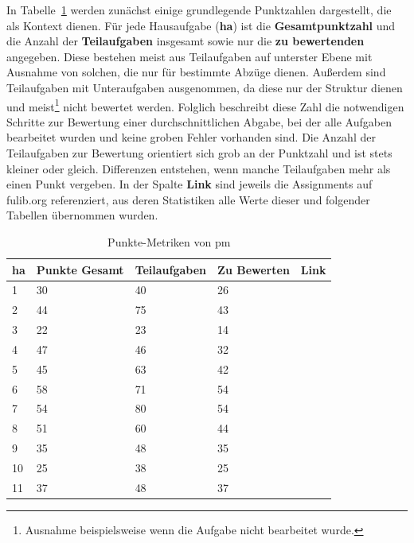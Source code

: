 In Tabelle~\ref{tbl:pm-points} werden zunächst einige grundlegende Punktzahlen dargestellt, die als Kontext dienen.
Für jede Hausaufgabe (\textbf{\acs{ha}}) ist die \textbf{Gesamtpunktzahl} und die Anzahl der \textbf{Teilaufgaben} insgesamt sowie nur die \textbf{zu bewertenden} angegeben.
Diese bestehen meist aus Teilaufgaben auf unterster Ebene mit Ausnahme von solchen, die nur für bestimmte Abzüge dienen.
Außerdem sind Teilaufgaben mit Unteraufgaben ausgenommen, da diese nur der Struktur dienen und meist\footnote{
    Ausnahme beispielsweise wenn die Aufgabe nicht bearbeitet wurde.
} nicht bewertet werden.
Folglich beschreibt diese Zahl die notwendigen Schritte zur Bewertung einer durchschnittlichen Abgabe, bei der alle Aufgaben bearbeitet wurden und keine groben Fehler vorhanden sind.
Die Anzahl der Teilaufgaben zur Bewertung orientiert sich grob an der Punktzahl und ist stets kleiner oder gleich.
Differenzen entstehen, wenn manche Teilaufgaben mehr als einen Punkt vergeben.
In der Spalte \textbf{Link} sind jeweils die Assignments auf fulib.org referenziert, aus deren Statistiken alle Werte dieser und folgender Tabellen übernommen wurden.

\renewcommand{\thefootnote}{\roman{footnote}}

\begin{table}
    \centering
    \caption{Punkte-Metriken von \ac{pm}}
    \begin{tabular}{|l|l|l|l|l|}
    \hline
        \acs{ha} & Punkte Gesamt & Teilaufgaben & Zu Bewerten & Link \\ \hline
        1  & 30 & 40 & 26 & \footnotemark[1] \\ \hline
        2  & 44 & 75 & 43 & \footnotemark[2] \\ \hline
        3  & 22 & 23 & 14 & \footnotemark[3] \\ \hline
        4  & 47 & 46 & 32 & \footnotemark[4] \\ \hline
        5  & 45 & 63 & 42 & \footnotemark[5] \\ \hline
        6  & 58 & 71 & 54 & \footnotemark[6] \\ \hline
        7  & 54 & 80 & 54 & \footnotemark[7] \\ \hline
        8  & 51 & 60 & 44 & \footnotemark[8] \\ \hline
        9  & 35 & 48 & 35 & \footnotemark[9] \\ \hline
        10 & 25 & 38 & 25 & \footnotemark[10] \\ \hline
        11 & 37 & 48 & 37 & \footnotemark[11] \\ \hline
    \end{tabular}
    \label{tbl:pm-points}
\end{table}

